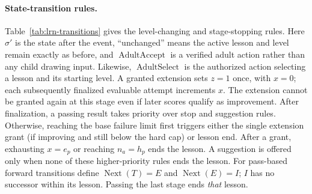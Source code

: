 \documentclass[12pt]{article}
\renewcommand{\_}{\textunderscore\allowbreak}%
\begin{document}
\paragraph{State-transition rules.}
Table~\ref{tab:lrn-transitions} gives the level-changing and stage-stopping
rules. Here $\sigma'$ is the state after the event, ``unchanged'' means the
active lesson and level remain exactly as before, and
$\operatorname{AdultAccept}$ is a verified adult action rather than any child
drawing input. Likewise, $\operatorname{AdultSelect}$ is the authorized action
selecting a lesson and its starting level. A granted extension sets $z=1$ once,
with $x=0$; each subsequently finalized evaluable attempt increments $x$. The
extension cannot be granted again at this stage even if later scores qualify as
improvement. After finalization, a passing result takes priority over stop and
suggestion rules. Otherwise, reaching the base failure limit first triggers
either the single extension grant (if improving and still below the hard cap) or
lesson end. After a grant, exhausting $x=e_p$ or reaching $n_a=h_p$ ends the
lesson. A suggestion is offered only when none of these higher-priority rules
ends the lesson. For pass-based forward transitions define
$\operatorname{Next}(T)=E$ and $\operatorname{Next}(E)=I$; $I$ has no successor
within its lesson. Passing the last stage ends \emph{that} lesson.
\end{document}

